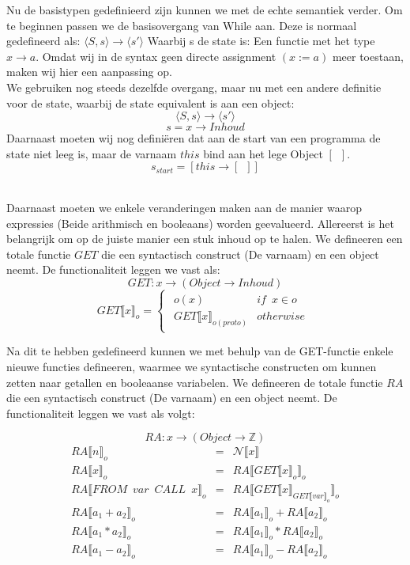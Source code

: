 \documentclass[12pt]{article}
\begin{document}
Nu de basistypen gedefinieerd zijn kunnen we met de echte semantiek verder. Om te beginnen passen we de basisovergang van While aan. Deze is normaal gedefineerd als:
$ \langle S,s \rangle \rightarrow \langle s\prime \rangle $
Waarbij s de state is: Een functie met het type
$ x \rightarrow a $.
Omdat wij in de syntax geen directe assignment $(x := a)$ meer toestaan, maken wij hier een aanpassing op.\\
We gebruiken nog steeds dezelfde overgang, maar nu met een andere definitie voor de state, waarbij de state equivalent is aan een object:
\[ \langle S,s \rangle \rightarrow \langle s\prime \rangle \]
\[ s = x \rightarrow Inhoud \]
Daarnaast moeten wij nog definiëren dat aan de start van een programma de state niet leeg is, maar de varnaam $ this $ bind aan het lege Object $ [\enspace] $.
\[ s_{start} = [this \rightarrow [\enspace]]\]
\\
\par
Daarnaast moeten we enkele veranderingen maken aan de manier waarop expressies (Beide arithmisch en booleaans) worden geevalueerd. 
Allereerst is het belangrijk om op de juiste manier een stuk inhoud op te halen. We defineeren een totale functie $ GET $ die een syntactisch construct (De varnaam) en een object neemt. De functionaliteit leggen we vast als:
\[ GET: x \rightarrow (Object \rightarrow Inhoud) \]
\[
GET\llbracket x \rrbracket_o =
\begin{cases}
\begin{matrix}
o(x) & if \enspace x \in o\\
GET\llbracket x \rrbracket_{o(proto)} & otherwise
\end{matrix}
\end{cases}
\]

Na dit te hebben gedefineerd kunnen we met behulp van de GET-functie enkele nieuwe functies defineeren, waarmee we syntactische constructen om kunnen zetten naar getallen en booleaanse variabelen. We defineeren de totale functie $ RA $ die een syntactisch construct (De varnaam) en een object neemt. De functionaliteit leggen we vast als volgt:

\[ RA: x \rightarrow (Object \rightarrow \mathds{Z} ) \]
\[
\begin{matrix}
RA\llbracket n \rrbracket_o & = & \mathcal{N}\llbracket x \rrbracket\\
RA\llbracket x \rrbracket_o & = & RA\llbracket GET\llbracket x \rrbracket_o \rrbracket_o\\
RA\llbracket FROM \enspace var \enspace CALL \enspace x \rrbracket_o & = & RA\llbracket GET\llbracket x \rrbracket_{GET\llbracket var \rrbracket_o} \rrbracket_o\\
RA\llbracket a_1 + a_2 \rrbracket_o & = & RA\llbracket a_1 \rrbracket_o + RA\llbracket a_2 \rrbracket_o\\
RA\llbracket a_1 * a_2 \rrbracket_o & = & RA\llbracket a_1 \rrbracket_o * RA\llbracket a_2 \rrbracket_o\\
RA\llbracket a_1 - a_2 \rrbracket_o & = & RA\llbracket a_1 \rrbracket_o - RA\llbracket a_2 \rrbracket_o\\
\end{matrix}
\]
\end{document}
